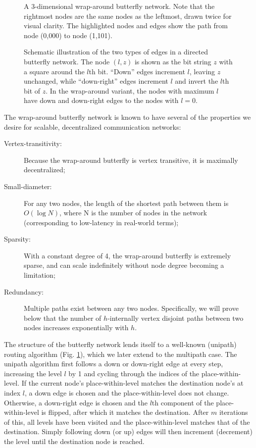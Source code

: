 \documentclass[10pt,letterpaper]{article}
\begin{document}
\begin{figure}[H]
\begin{center}
\end{center}
\caption{
A 3-dimensional wrap-around butterfly network.
Note that the rightmost nodes are the same nodes as the leftmost,
drawn twice for visual clarity.
The highlighted nodes and edges show the path from node (0,000)
to node (1,101).
\label{fig:bf-route}
}
\end{figure}

\begin{figure}[!h]
\begin{center}
\end{center}
\caption{
Schematic illustration of the two types of edges in a directed butterfly
network.
The node $(l,z)$ is shown as the bit string $z$ with a square around the
$l$th bit.
``Down'' edges increment $l$, leaving $z$ unchanged,
while ``down-right'' edges increment $l$ and invert the $l$th bit of $z$.
In the wrap-around variant, the nodes with maximum $l$ have down and down-right
edges to the nodes with $l=0$.
\label{fig:butterfly}
}
\end{figure}

The wrap-around butterfly network is known to have several of the properties
we desire for scalable, decentralized communication networks:
\begin{description}
\item[Vertex-transitivity:]
Because the wrap-around butterfly is vertex transitive,
it is maximally decentralized;
\item[Small-diameter:]
For any two nodes, the length of the shortest path between them is
$O(\log N)$, where N is the number of nodes in the network
(corresponding to low-latency in real-world terms);
\item[Sparsity:]
With a constant degree of 4, the wrap-around butterfly is extremely sparse,
and can scale indefinitely without node degree becoming a limitation;
\item [Redundancy:]
Multiple paths exist between any two nodes.
Specifically, we will prove below that the number of
$h$-internally vertex disjoint paths between two
nodes increases exponentially with $h$.
\end{description}

The structure of the butterfly network lends itself to a well-known
(unipath) routing algorithm (Fig. \ref{fig:bf-route}),
which we later extend to the multipath case.
The unipath algorithm first follows a down or down-right edge at every step,
increasing the level $l$ by 1 and cycling through the
indices of the place-within-level.
If the current node's place-within-level matches the destination node's at
index $l$,
a down edge is chosen and the place-within-level does not change.
Otherwise, a down-right edge is chosen and the $l$th component of the
place-within-level is flipped,
after which it matches the destination.
After $m$ iterations of this, all levels have been visited
and the place-within-level matches that of the destination.
Simply following down (or up) edges will then increment (decrement) the
level until the destination node is reached.
\end{document}
